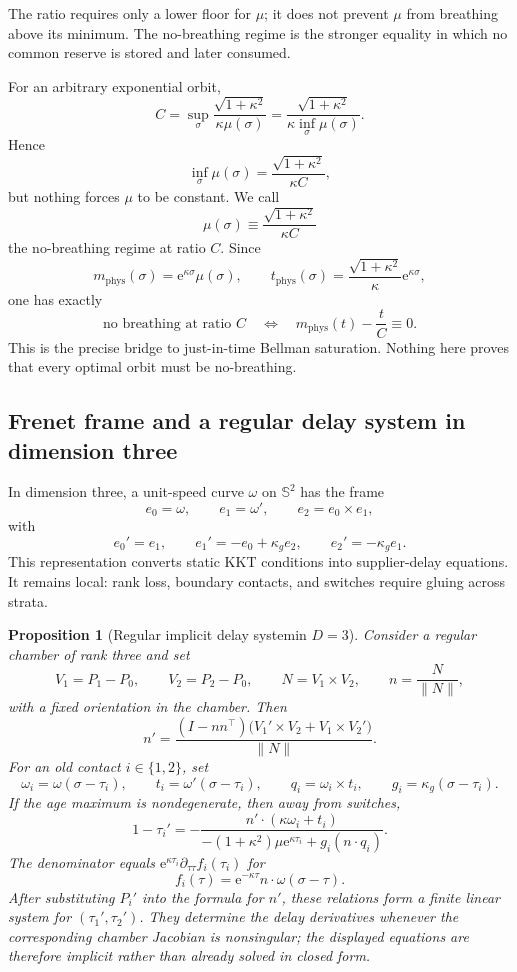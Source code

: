 \documentclass[10pt,a4paper]{article}
\newcommand{\Sph}{\mathbb{S}}
\newcommand{\e}{\mathrm{e}}
\newcommand{\tphys}{t_{\mathrm{phys}}}
\theoremstyle{plain}
\newtheorem{proposition}[theorem]{Proposition}
\theoremstyle{definition}
\theoremstyle{remark}
\begin{document}
The ratio requires only a lower floor for $\mu$; it does not prevent $\mu$ from breathing above its minimum. The no-breathing regime is the stronger equality in which no common reserve is stored and later consumed.

For an arbitrary exponential orbit,
\[
  C=\sup_\sigma\frac{\sqrt{1+\kappa^2}}{\kappa\mu(\sigma)}
  =\frac{\sqrt{1+\kappa^2}}{\kappa\inf_\sigma\mu(\sigma)}.
\]
Hence
\[
  \inf_\sigma\mu(\sigma)=\frac{\sqrt{1+\kappa^2}}{\kappa C},
\]
but nothing forces $\mu$ to be constant. We call
\[
  \mu(\sigma)\equiv\frac{\sqrt{1+\kappa^2}}{\kappa C}
\]
the no-breathing regime at ratio $C$. Since
\[
  m_{\mathrm{phys}}(\sigma)=\e^{\kappa\sigma}\mu(\sigma),
  \qquad
  \tphys(\sigma)=\frac{\sqrt{1+\kappa^2}}{\kappa}\e^{\kappa\sigma},
\]
one has exactly
\[
  \text{no breathing at ratio }C
  \quad\Longleftrightarrow\quad
  m_{\mathrm{phys}}(t)-\frac{t}{C}\equiv0.
\]
This is the precise bridge to just-in-time Bellman saturation. Nothing here proves that every optimal orbit must be no-breathing.

\subsection{Frenet frame and a regular delay system in dimension three}

In dimension three, a unit-speed curve $\omega$ on $\Sph^2$ has the frame
\[
  e_0=\omega,
  \qquad
  e_1=\omega',
  \qquad
  e_2=e_0\times e_1,
\]
with
\[
  e_0'=e_1,
  \qquad
  e_1'=-e_0+\kappa_g e_2,
  \qquad
  e_2'=-\kappa_g e_1.
\]
This representation converts static KKT conditions into supplier-delay equations. It remains local: rank loss, boundary contacts, and switches require gluing across strata.

\begin{proposition}[Regular implicit delay systemin $D=3$]
Consider a regular chamber of rank three and set
\[
  V_1=P_1-P_0,
  \qquad
  V_2=P_2-P_0,
  \qquad
  N=V_1\times V_2,
  \qquad
  n=\frac{N}{\|N\|},
\]
with a fixed orientation in the chamber. Then
\[
  n'
  =\frac{(I-nn^\top)\bigl(V_1'\times V_2+V_1\times V_2'\bigr)}{\|N\|}.
\]
For an old contact $i\in\{1,2\}$, set
\[
  \omega_i=\omega(\sigma-\tau_i),
  \qquad
  t_i=\omega'(\sigma-\tau_i),
  \qquad
  q_i=\omega_i\times t_i,
  \qquad
  g_i=\kappa_g(\sigma-\tau_i).
\]
If the age maximum is nondegenerate, then away from switches,
\[
  1-\tau_i'
  =-\frac{n'\cdot(\kappa\omega_i+t_i)}{-(1+\kappa^2)\mu\e^{\kappa\tau_i}+g_i(n\cdot q_i)}.
\]
The denominator equals $\e^{\kappa\tau_i}\partial_{\tau\tau}f_i(\tau_i)$ for
\[
  f_i(\tau)=\e^{-\kappa\tau}n\cdot\omega(\sigma-\tau).
\]
After substituting $P_i'$ into the formula for $n'$, these relations form a finite linear system for $(\tau_1',\tau_2')$. They determine the delay derivatives whenever the corresponding chamber Jacobian is nonsingular; the displayed equations are therefore implicit rather than already solved in closed form.
\end{proposition}
\end{document}
